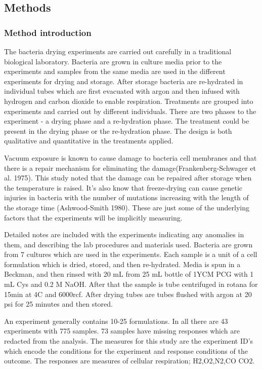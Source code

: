 \documentclass[12pt,]{article}
\begin{document}
\subsection{Methods}\label{methods}

\subsubsection{Method introduction}\label{method-introduction}

The bacteria drying experiments are carried out carefully in a
traditional biological laboratory. Bacteria are grown in culture media
prior to the experiments and samples from the same media are used in the
different experiments for drying and storage. After storage bacteria are
re-hydrated in individual tubes which are first evacuated with argon and
then infused with hydrogen and carbon dioxide to enable respiration.
Treatments are grouped into experiments and carried out by different
individuals. There are two phases to the experiment - a drying phase and
a re-hydration phase. The treatment could be present in the drying phase
or the re-hydration phase. The design is both qualitative and
quantitative in the treatments applied.

Vacuum exposure is known to cause damage to bacteria cell membranes and
that there is a repair mechanism for eliminating the
damage(Frankenberg-Schwager et al. 1975). This study noted that the
damage can be repaired after storage when the temperature is raised.
It's also know that freeze-drying can cause genetic injuries in bacteria
with the number of mutations increasing with the length of the storage
time (Ashwood-Smith 1980). These are just some of the underlying factors
that the experiments will be implicitly measuring.

Detailed notes are included with the experiments indicating any
anomalies in them, and describing the lab procedures and materials used.
Bacteria are grown from 7 cultures which are used in the experiments.
Each sample is a unit of a cell formulation which is dried, stored, and
then re-hydrated. Media is spun in a Beckman, and then rinsed with 20 mL
from 25 mL bottle of 1YCM PCG with 1 mL Cys and 0.2 M NaOH. After that
the sample is tube centrifuged in rotana for 15min at 4C and 6000rcf.
After drying tubes are tubes flushed with argon at 20 psi for 25 minutes
and then stored.

An experiment generally contains 10-25 formulations. In all there are 43
experiments with 775 samples. 73 samples have missing responses which
are redacted from the analysis. The measures for this study are the
experiment ID's which encode the conditions for the experiment and
response conditions of the outcome. The responses are measures of
cellular respiration; H2,O2,N2,CO CO2.
\end{document}
